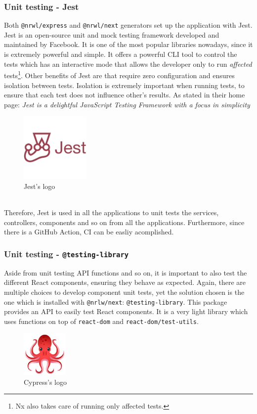 \documentclass[a4paper, 12pt, oneside]{book}
\begin{document}
\subsubsection{Unit testing - Jest}
Both \texttt{@nrwl/express} and \texttt{@nrwl/next} generators set up the application with Jest. Jest is an open-source unit and mock testing framework developed and maintained by Facebook. It is one of the most popular libraries nowadays, since it is extremely powerful and simple. It offers a powerful CLI tool to control the tests which has an interactive mode that allows the developer only to run \emph{affected} tests\footnote{Nx also takes care of running only affected tests.}. Other benefits of Jest are that require zero configuration and ensures isolation between tests. Isolation is extremely important when running tests, to ensure that each test does not influence other's results. As stated in their home page: \emph{Jest is a delightful JavaScript Testing Framework with a focus in simplicity}
\\
\begin{figure}[h!]
	\centering
	\includegraphics[width=0.3\textwidth]{assets/jest-logo.png}
	\caption{Jest's logo}
\end{figure}
\\
Therefore, Jest is used in all the applications to unit tests the services, controllers, components and so on from all the applications. Furthermore, since there is a GitHub Action, CI can be easliy acomplished.
\subsubsection{Unit testing - \texttt{@testing-library}}
Aside from unit testing API functions and so on, it is important to also test the different React components, ensuring they behave as expected. Again, there are multiple choices to develop component unit tests, yet the solution chosen is the one which is installed with \texttt{@nrlw/next}: \texttt{@testing-library}. This package provides an API to easily test React components. It is a very light library which uses functions on top of \texttt{react-dom} and \texttt{react-dom/test-utils}.
\\
\begin{figure}[h!]
	\centering
	\includegraphics[width=0.2\textwidth]{assets/testing-library-logo.png}
	\caption{Cypress's logo}
\end{figure}
\end{document}
